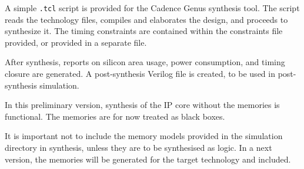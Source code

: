 A simple {\tt .tcl} script is provided for the Cadence Genus synthesis tool. The
script reads the technology files, compiles and elaborates the design, and
proceeds to synthesize it. The timing constraints are contained within the
constraints file provided, or provided in a separate file.

After synthesis, reports on silicon area usage, power consumption, and timing
closure are generated. A post-synthesis Verilog file is created, to be used in
post-synthesis simulation.

In this preliminary version, synthesis of the IP core without the memories is
functional. The memories are for now treated as black boxes.

It is important not to include the memory models provided in the simulation
directory in synthesis, unless they are to be synthesised as logic. In a
next version, the memories will be generated for the target technology and
included.



